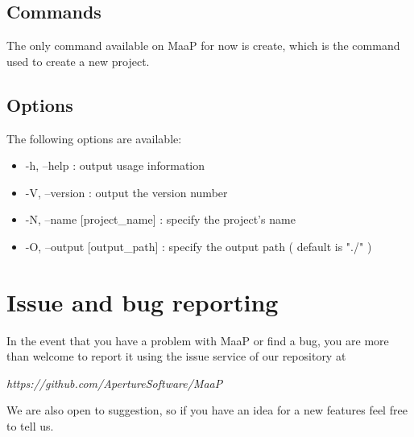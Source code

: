 \subsection{Commands}
\label{commands}
The only command available on MaaP for now is create, which is the command used to create a new project.

\subsection{Options}
\label{options}
The following options are available:
\begin{itemize}
\item -h, --help    :              output usage information
\item -V, --version  :             output the version number
\item -N, --name [project\_name] :  specify the project's name
\item -O, --output [output\_path] : specify the output path ( default is "./" )
\end{itemize}

\section{Issue and bug reporting}
In the event that you have a problem with MaaP or find a bug, you are more than welcome to report it using the issue service of our repository at

\begin{center}
\textit{https://github.com/ApertureSoftware/MaaP}
\end{center}

We are also open to suggestion, so if you have an idea for a new features feel free to tell us.








